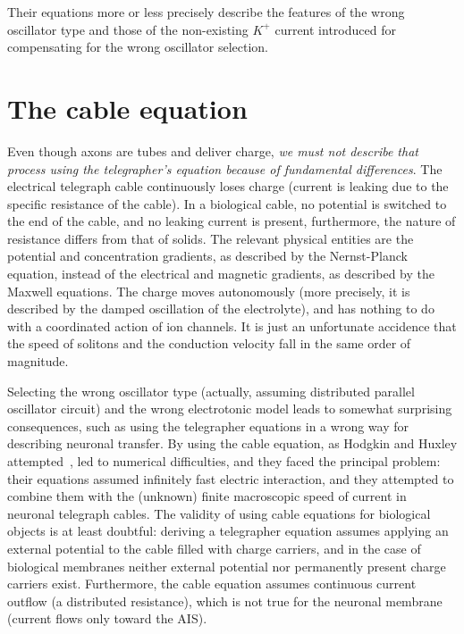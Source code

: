 Their equations more or less precisely describe
the features of the wrong oscillator type and those of the
non-existing $K^+$ current introduced for compensating for the wrong oscillator selection.



\section{The cable equation\label{sec:Physics-CableEquation}}

Even though axons are tubes and deliver
charge, \emph{we must not describe that process using the telegrapher's
	equation because of fundamental differences}. The electrical telegraph
cable continuously loses charge (current is leaking due to the specific
resistance of the cable).  In a biological cable, no potential
is switched to the end of the cable, and no leaking current is present, furthermore, the nature of resistance differs from
that of solids. The relevant physical
entities are the potential and concentration gradients, as described by
the Nernst-Planck equation, instead of the electrical and magnetic gradients,
as described by the Maxwell equations.
The charge moves autonomously (more precisely, it is described by the damped oscillation of the electrolyte), and has nothing to do with a coordinated action of ion channels. It is just an unfortunate accidence that the speed of solitons and the conduction velocity fall in the same order of magnitude.


Selecting the wrong oscillator type (actually, assuming distributed parallel
oscillator circuit) and the wrong electrotonic model
leads to somewhat surprising consequences,
such as using the telegrapher equations in a wrong way for
describing neuronal transfer.
By using the cable equation, as Hodgkin and Huxley attempted~\cite{HodgkinHuxley:1952}, led to
numerical difficulties, and they faced the principal problem: their
equations assumed infinitely fast electric interaction, and they attempted
to combine them with the (unknown) finite macroscopic speed of current
in neuronal telegraph cables. The validity of using cable equations
for biological objects is at least doubtful: deriving a telegrapher
equation assumes applying an external potential to the cable filled
with charge carriers, and in the case of biological membranes neither
external potential nor permanently present charge carriers exist.
Furthermore, the cable equation assumes continuous current outflow
(a distributed resistance), which is not true for the neuronal membrane
(current flows only toward the \gls{AIS}).


